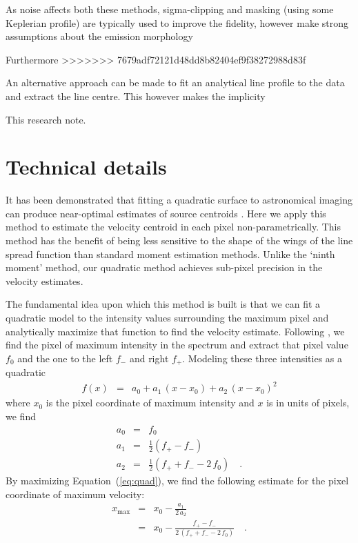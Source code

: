 \documentclass[rnaas]{aastex62}
\renewcommand{\eqref}[1]{\ref{eq:#1}}
\newcommand{\Eq}[1]{Equation~(\eqref{#1})}
\newcommand{\eqlabel}[1]{\label{eq:#1}}
\begin{document}
As noise affects both these methods, sigma-clipping and masking (using some Keplerian profile) are typically used to improve the fidelity, however make strong assumptions about the emission morphology

Furthermore
>>>>>>> 7679adf72121d48dd8b82404ef9f38272988d83f

An alternative approach can be made to fit an analytical line profile to the data and extract the line centre. This however makes the implicity

This research note. \citep{Perez:2018}

\section{Technical details}

It has been demonstrated that fitting a quadratic surface to astronomical
imaging can produce near-optimal estimates of source centroids
\citep{Vakili:2016}.
Here we apply this method to estimate the velocity centroid in each pixel
non-parametrically.
This method has the benefit of being less sensitive to the shape of the wings
of the line spread function than standard moment estimation methods.
Unlike the `ninth moment' method, our quadratic method achieves sub-pixel
precision in the velocity estimates.

The fundamental idea upon which this method is built is that we can fit a
quadratic model to the intensity values surrounding the maximum pixel and
analytically maximize that function to find the velocity estimate.
Following \citet{Vakili:2016}, we find the pixel of maximum intensity in the
spectrum and extract that pixel value $f_0$ and the one to the left $f_-$ and
right $f_+$.
Modeling these three intensities as a quadratic
\begin{eqnarray}
f(x) &=& a_0 + a_1\,(x-x_0) + a_2\,{(x-x_0)}^2
\eqlabel{quad}
\end{eqnarray}
where $x_0$ is the pixel coordinate of maximum intensity and $x$ is in units
of pixels, we find
\begin{eqnarray}
a_0 &=& f_0 \\
a_1 &=& \frac{1}{2}(f_+ - f_-) \\
a_2 &=& \frac{1}{2}(f_+ + f_- - 2\,f_0) \quad.
\end{eqnarray}
By maximizing \Eq{quad}, we find the following estimate for the pixel
coordinate of maximum velocity:
\begin{eqnarray}
x_\mathrm{max} &=& x_0 - \frac{a_1}{2\,a_2} \\
    &=& x_0 - \frac{f_+ - f_-}{2\,(f_+ + f_- - 2\,f_0)} \quad.
\end{eqnarray}
\end{document}

